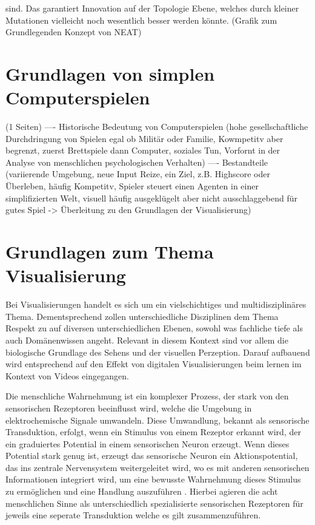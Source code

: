 sind. Das garantiert Innovation auf der Topologie Ebene, welches durch kleiner Mutationen vielleicht noch wesentlich besser werden könnte. (Grafik zum Grundlegenden Konzept von NEAT)

\section{Grundlagen von simplen Computerspielen}
(1 Seiten)
---- Historische Bedeutung von Computerspielen (hohe gesellschaftliche Durchdringung von Spielen egal ob Militär oder Familie, Kowmpetitv aber begrenzt, zuerst Brettspiele dann Computer, soziales Tun, Vorfornt in der Analyse von menschlichen psychologischen Verhalten)
---- Bestandteile (variierende Umgebung, neue Input Reize, ein Ziel, z.B. Highscore oder Überleben, häufig Kompetitv, Spieler steuert einen Agenten in einer simplifizierten Welt, visuell häufig ausgeklügelt aber nicht ausschlaggebend für gutes Spiel -> Überleitung zu den Grundlagen der Visualisierung)

\section{Grundlagen zum Thema Visualisierung}

Bei Visualisierungen handelt es sich um ein vielschichtiges und multidisziplinäres Thema. Dementsprechend zollen unterschiedliche Disziplinen dem Thema Respekt zu auf diversen unterschiedlichen Ebenen, sowohl was fachliche tiefe als auch Domänenwissen angeht. Relevant in diesem Kontext sind vor allem die biologische Grundlage des Sehens und der visuellen Perzeption. Darauf aufbauend wird entsprechend auf den Effekt von digitalen Visualisierungen beim lernen im Kontext von Videos eingegangen.

Die menschliche Wahrnehmung ist ein komplexer Prozess, der stark von den sensorischen Rezeptoren beeinflusst wird, welche die Umgebung in elektrochemische Signale umwandeln. Diese Umwandlung, bekannt als sensorische Transduktion, erfolgt, wenn ein Stimulus von einem Rezeptor erkannt wird, der ein graduiertes Potential in einem sensorischen Neuron erzeugt. Wenn dieses Potential stark genug ist, erzeugt das sensorische Neuron ein Aktionspotential, das ins zentrale Nervensystem weitergeleitet wird, wo es mit anderen sensorischen Informationen integriert wird, um eine bewusste Wahrnehmung dieses Stimulus zu ermöglichen und eine Handlung auszuführen \cite{BasicHumanPhysiology, AnatomyPhysiology}. Hierbei agieren die acht menschlichen Sinne als unterschiedlich spezialisierte sensorischen Rezeptoren für jeweils eine seperate Transduktion welche es gilt zusammenzuführen. 

